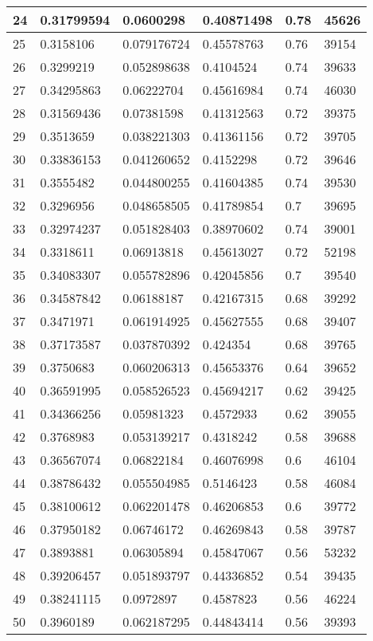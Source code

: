 \begin{longtable}{|l|l|l|l|l|l|}
24 & 0.31799594 & 0.0600298 & 0.40871498 & 0.78 & 45626 \\ \hline 
25 & 0.3158106 & 0.079176724 & 0.45578763 & 0.76 & 39154 \\ \hline 
26 & 0.3299219 & 0.052898638 & 0.4104524 & 0.74 & 39633 \\ \hline 
27 & 0.34295863 & 0.06222704 & 0.45616984 & 0.74 & 46030 \\ \hline 
28 & 0.31569436 & 0.07381598 & 0.41312563 & 0.72 & 39375 \\ \hline 
29 & 0.3513659 & 0.038221303 & 0.41361156 & 0.72 & 39705 \\ \hline 
30 & 0.33836153 & 0.041260652 & 0.4152298 & 0.72 & 39646 \\ \hline 
31 & 0.3555482 & 0.044800255 & 0.41604385 & 0.74 & 39530 \\ \hline 
32 & 0.3296956 & 0.048658505 & 0.41789854 & 0.7 & 39695 \\ \hline 
33 & 0.32974237 & 0.051828403 & 0.38970602 & 0.74 & 39001 \\ \hline 
34 & 0.3318611 & 0.06913818 & 0.45613027 & 0.72 & 52198 \\ \hline 
35 & 0.34083307 & 0.055782896 & 0.42045856 & 0.7 & 39540 \\ \hline 
36 & 0.34587842 & 0.06188187 & 0.42167315 & 0.68 & 39292 \\ \hline 
37 & 0.3471971 & 0.061914925 & 0.45627555 & 0.68 & 39407 \\ \hline 
38 & 0.37173587 & 0.037870392 & 0.424354 & 0.68 & 39765 \\ \hline 
39 & 0.3750683 & 0.060206313 & 0.45653376 & 0.64 & 39652 \\ \hline 
40 & 0.36591995 & 0.058526523 & 0.45694217 & 0.62 & 39425 \\ \hline 
41 & 0.34366256 & 0.05981323 & 0.4572933 & 0.62 & 39055 \\ \hline 
42 & 0.3768983 & 0.053139217 & 0.4318242 & 0.58 & 39688 \\ \hline 
43 & 0.36567074 & 0.06822184 & 0.46076998 & 0.6 & 46104 \\ \hline 
44 & 0.38786432 & 0.055504985 & 0.5146423 & 0.58 & 46084 \\ \hline 
45 & 0.38100612 & 0.062201478 & 0.46206853 & 0.6 & 39772 \\ \hline 
46 & 0.37950182 & 0.06746172 & 0.46269843 & 0.58 & 39787 \\ \hline 
47 & 0.3893881 & 0.06305894 & 0.45847067 & 0.56 & 53232 \\ \hline 
48 & 0.39206457 & 0.051893797 & 0.44336852 & 0.54 & 39435 \\ \hline 
49 & 0.38241115 & 0.0972897 & 0.4587823 & 0.56 & 46224 \\ \hline 
50 & 0.3960189 & 0.062187295 & 0.44843414 & 0.56 & 39393 \\ \hline 
\end{longtable}